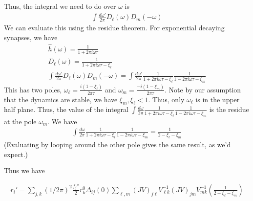 \documentclass [12pt]{amsart}
\theoremstyle{definition}
\newcommand{\inv}{^{-1}}
\begin{document}
Thus, the integral we need to do over $\omega$ is 
\begin{align*}
\int \frac{d\omega'}{2\pi} D_\ell(\omega)D_m(-\omega)
\end{align*}
We can evaluate this using the residue theorem. For exponential decaying synapses, we have 
\begin{align*}
\hat h (\omega) = \frac{1}{1 +2\pi i \omega \tau}\\
 D_\ell(\omega) = \frac{1}{1 + 2\pi i \omega \tau - \xi_\ell}\\
 \int \frac{d\omega'}{2\pi} D_\ell(\omega)D_m(-\omega)
= 
 \int \frac{d\omega'}{2\pi} \frac{1}{1 + 2\pi i \omega \tau - \xi_\ell} \frac{1}{1 - 2\pi i \omega \tau - \xi_m}
\end{align*}
This has two poles, 
$\omega_\ell = \frac{i (1 - \xi_\ell)}{2\pi \tau}$ and $\omega_m = \frac{-i (1 - \xi_m)}{2\pi \tau}$. Note by our assumption that the dynamics are stable, we have $\xi_m, \xi_\ell < 1$. Thus, only $\omega_\ell$ is in the upper half plane. Thus, the value of the integral $\int \frac{d\omega}{2\pi} \frac{1}{1 + 2\pi i \omega \tau - \xi_\ell} \frac{1}{1 - 2\pi i \omega \tau - \xi_m}$ is the residue at the pole $\omega_m$. We have
\begin{align*}
\int \frac{d\omega}{2\pi} \frac{1}{1 + 2\pi i \omega \tau - \xi_\ell} \frac{1}{1 - 2\pi i \omega \tau - \xi_m} = \frac{1}{2 - \xi_\ell - \xi_m}
\end{align*}
(Evaluating by looping around the other pole gives the same result, as we'd expect.) 

Thus we have 

\begin{align*}
r_i' = \sum_{j, k} (1/2\pi)^2 \frac{f_j''}{2} r_k^0 \hat \Delta_{ij}(0) \sum_{\ell, m} (JV)_{j\ell} V_{\ell k}\inv(JV)_{jm} V\inv_{mk} \left(\frac 1 { 2  - \xi_\ell - \xi_m}\right)
\end{align*}





\end{document}
